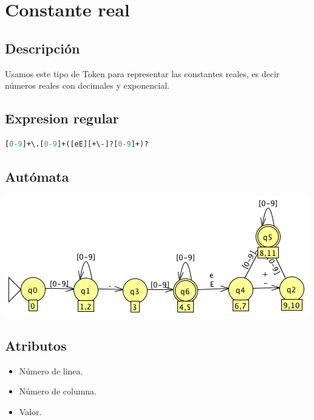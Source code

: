             
            
            
	\section{Constante real}

        \subsection{Descripción}

            Usamos este tipo de Token para representar las constantes reales, es decir números reales con decimales y exponencial.

        \subsection{Expresion regular}

            \begin{lstlisting}[language=Perl]
[0-9]+\.[0-9]+([eE][+\-]?[0-9]+)?
            \end{lstlisting}

        \subsection{Autómata}

            \includegraphics[scale=.7]{../Design/jflap/Constante_real.png}

        \subsection{Atributos}

            \begin{itemize}
                \item Número de linea.
                \item Número de columna.
                \item Valor.
            \end{itemize}

